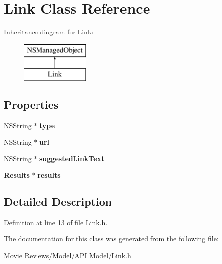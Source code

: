 \section{Link Class Reference}
\label{interface_link}
Inheritance diagram for Link\+:\begin{figure}[H]
\begin{center}
\leavevmode
\includegraphics[height=2.000000cm]{interface_link}
\end{center}
\end{figure}
\subsection*{Properties}
\begin{DoxyCompactItemize}
\item 
N\+S\+String $\ast$ {\bfseries type}\label{interface_link_a62323fde31bdc8f98747890e00fa38b1}

\item 
N\+S\+String $\ast$ {\bfseries url}\label{interface_link_a4453167856bb9ca80e2b760284fe868d}

\item 
N\+S\+String $\ast$ {\bfseries suggested\+Link\+Text}\label{interface_link_a82c84a67cea892e61030e824b784c98e}

\item 
{\bf Results} $\ast$ {\bfseries results}\label{interface_link_a1966c56381acd1dedfe38b996053e24d}

\end{DoxyCompactItemize}


\subsection{Detailed Description}


Definition at line 13 of file Link.\+h.



The documentation for this class was generated from the following file\+:\begin{DoxyCompactItemize}
\item 
Movie Reviews/\+Model/\+A\+P\+I Model/Link.\+h\end{DoxyCompactItemize}
